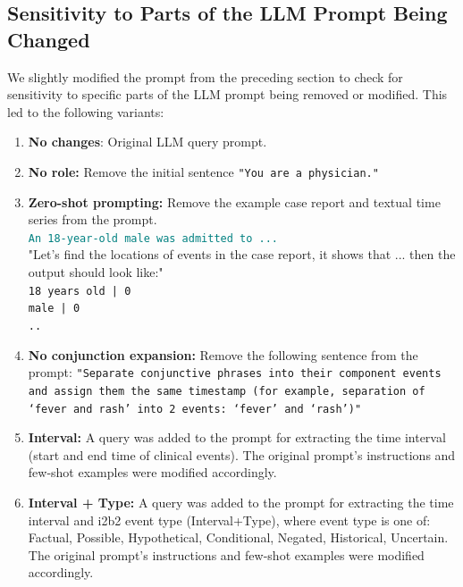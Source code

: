 \subsection{Sensitivity to Parts of the LLM Prompt Being Changed}
\label{apd:sensitivity-llm-prompt}

We slightly modified the prompt from the preceding section to check for sensitivity to specific parts of the LLM prompt being removed or modified.
This led to the following variants:
\begin{enumerate}
    \item \textbf{No changes}: Original LLM query prompt. %
    
    \item \textbf{No role:} Remove the initial sentence \texttt{"You are a physician."}
    
    \item \textbf{Zero-shot prompting:} Remove the example case report and textual time series from the prompt. \\
    \textcolor{teal}{\texttt{An 18-year-old male was admitted to ...}}\\
    "Let's find the locations of events in the case report, it shows that ... then the output should look like:"\\
    \texttt{18 years old | 0 \\
    male | 0 \\
    ..}

    \item \textbf{No conjunction expansion:} Remove the following sentence from the prompt: \texttt{"Separate conjunctive phrases into their component events and assign them the same timestamp (for example, separation of ‘fever and rash’ into 2 events: ‘fever’ and ‘rash’)"}
    
    \item \textbf{Interval:} A query was added to the prompt for extracting the time interval (start and end time of clinical events). The original prompt’s instructions and few-shot examples were modified accordingly. 
    
    \item \textbf{Interval + Type:} A query was added to the prompt for extracting the time interval and i2b2
    event type (Interval+Type), where event type is one of: Factual, Possible, Hypothetical, Conditional, Negated, Historical, Uncertain. The original prompt’s instructions and few-shot examples were modified accordingly. 
\end{enumerate}

